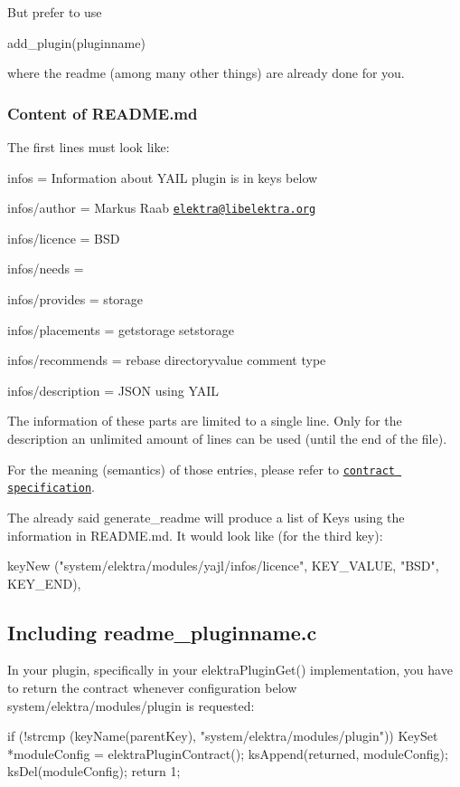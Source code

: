 But prefer to use \begin{DoxyVerb}    add_plugin(pluginname)
\end{DoxyVerb}


where the readme (among many other things) are already done for you.

\subsubsection*{Content of R\+E\+A\+D\+M\+E.\+md}

The first lines must look like\+:


\begin{DoxyItemize}
\item infos = Information about Y\+A\+I\+L plugin is in keys below
\item infos/author = Markus Raab \href{mailto:elektra@libelektra.org}{\tt elektra@libelektra.\+org}
\item infos/licence = B\+S\+D
\item infos/needs =
\item infos/provides = storage
\item infos/placements = getstorage setstorage
\item infos/recommends = rebase directoryvalue comment type
\item infos/description = J\+S\+O\+N using Y\+A\+I\+L
\end{DoxyItemize}

The information of these parts are limited to a single line. Only for the description an unlimited amount of lines can be used (until the end of the file).

For the meaning (semantics) of those entries, please refer to \href{/home/markus/Projekte/Elektra/current/doc/CONTRACT.ini}{\tt contract specification}.

The already said generate\+\_\+readme will produce a list of Keys using the information in R\+E\+A\+D\+M\+E.\+md. It would look like (for the third key)\+: \begin{DoxyVerb}            keyNew ("system/elektra/modules/yajl/infos/licence",
                    KEY_VALUE, "BSD", KEY_END),
\end{DoxyVerb}


\subsection*{Including readme\+\_\+pluginname.\+c}

In your plugin, specifically in your elektra\+Plugin\+Get() implementation, you have to return the contract whenever configuration below system/elektra/modules/plugin is requested\+: \begin{DoxyVerb}    if (!strcmp (keyName(parentKey), "system/elektra/modules/plugin"))
    {
            KeySet *moduleConfig = elektraPluginContract();
            ksAppend(returned, moduleConfig);
            ksDel(moduleConfig);
            return 1;
    }
\end{DoxyVerb}


